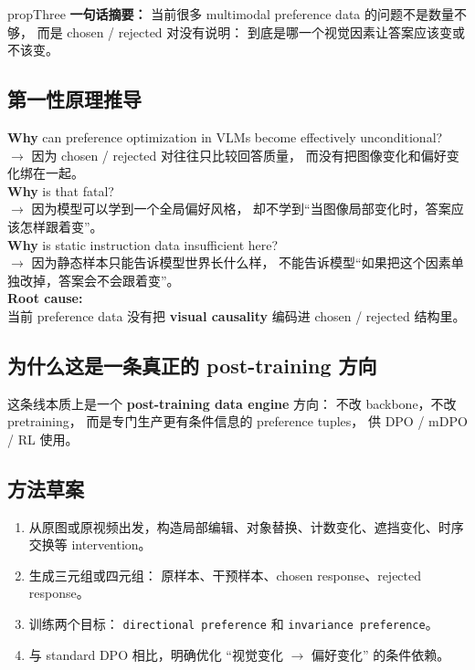 \documentclass[12pt,a4paper]{article}
\begin{document}
\begin{proposalbox}{propThree}
\textbf{一句话摘要：}
当前很多 multimodal preference data 的问题不是数量不够，
而是 chosen / rejected 对没有说明：
到底是哪一个视觉因素让答案应该变或不该变。
\end{proposalbox}

\subsection{第一性原理推导}

\begin{whybox}
\textbf{Why} can preference optimization in VLMs become effectively unconditional?\\
$\rightarrow$ 因为 chosen / rejected 对往往只比较回答质量，
而没有把图像变化和偏好变化绑在一起。\\[3pt]
\textbf{Why} is that fatal?\\
$\rightarrow$ 因为模型可以学到一个全局偏好风格，
却不学到``当图像局部变化时，答案应该怎样跟着变''。\\[3pt]
\textbf{Why} is static instruction data insufficient here?\\
$\rightarrow$ 因为静态样本只能告诉模型世界长什么样，
不能告诉模型``如果把这个因素单独改掉，答案会不会跟着变''。\\[3pt]
\textbf{Root cause:}\\
当前 preference data 没有把 \textbf{visual causality} 编码进 chosen / rejected 结构里。
\end{whybox}

\subsection{为什么这是一条真正的 post-training 方向}

这条线本质上是一个 \textbf{post-training data engine} 方向：
不改 backbone，不改 pretraining，
而是专门生产更有条件信息的 preference tuples，
供 DPO / mDPO / RL 使用。

\subsection{方法草案}

\begin{enumerate}[leftmargin=2em]
  \item 从原图或原视频出发，构造局部编辑、对象替换、计数变化、遮挡变化、时序交换等 intervention。
  \item 生成三元组或四元组：
    原样本、干预样本、chosen response、rejected response。
  \item 训练两个目标：
    \texttt{directional preference} 和 \texttt{invariance preference}。
  \item 与 standard DPO 相比，明确优化 ``视觉变化 $\rightarrow$ 偏好变化'' 的条件依赖。
\end{enumerate}
\end{document}
